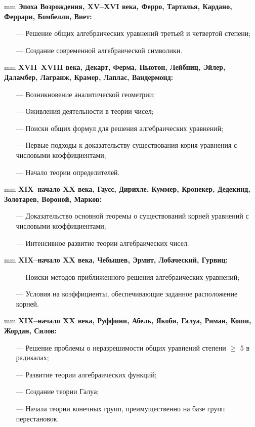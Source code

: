 \documentclass[12pt,english,russian]{article}
\begin{document}
	 mm
	{\bf Эпоха Возрождения, XV–XVI века, Ферро, Тарталья,
	Кардано, Феррари, Бомбелли, Виет:}
	\begin{enumerate}
	\item[---] Решение общих алгебраических уравнений третьей и четвертой степени;
	\item[---] Создание современной алгебраической символики.
	\end{enumerate}
	
	 mm
	{\bf XVII–XVIII века, Декарт, Ферма, Ньютон, Лейбниц, Эйлер, Даламбер, Лагранж, Крамер, Лаплас, Вандермонд:}
	\begin{enumerate}
	\item[---] Возникновение аналитической геометрии;
	\item[---] Оживления деятельности в теории чисел;
	\item[---] Поиски общих формул для решения алгебраических уравнений;
	\item[---] Первые подходы к доказательству существования корня уравнения с числовыми коэффициентами;
	\item[---] Начало теории определителей.
	\end{enumerate}

	 mm
	{\bf XIX–начало XX века, Гаусс, Дирихле, Куммер, Кронекер, Дедекинд, Золотарев, Вороной, Марков:}
	\begin{enumerate}
	\item[---] Доказательство основной теоремы о существований корней уравнений с числовыми коэффициентами;
	\item[---] Интенсивное развитие теории алгебраических чисел.
	\end{enumerate}
	
	 mm
	{\bf XIX–начало XX века, Чебышев, Эрмит, Лобаческий, Гурвиц:}
	\begin{enumerate}
	\item[---] Поиски методов приближенного решения алгебраических уравнений;
	\item[---] Условия на коэффициенты, обеспечивающие заданное расположение корней.
	\end{enumerate}
	
	 mm
	{\bf XIX–начало XX века, Руффини, Абель, Якоби, Галуа, Риман, Коши, Жордан, Силов:}
	\begin{enumerate}
	\item[---] Решение проблемы о неразрешимости общих уравнений степени $\geqslant$ 5 в радикалах;
	\item[---] Развитие теории алгебраических функций;
	\item[---] Создание теории Галуа;
	\item[---] Начала теории конечных групп, преимущественно на базе групп перестановок.
	\end{enumerate}
\end{document}
